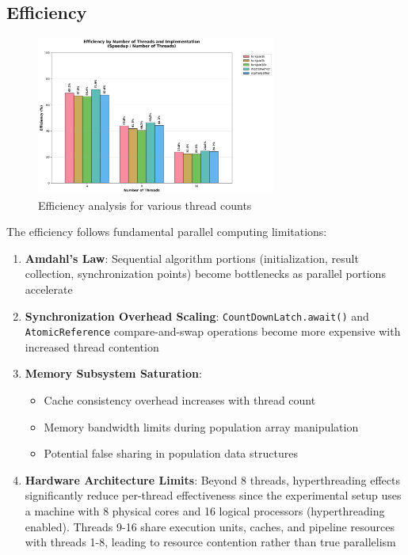 \newpage

\subsection{Efficiency}

\begin{figure}[htbp]
   \centering
   \includegraphics[width=0.7\textwidth]{images/efficiency_analysis.png}
   \caption{Efficiency analysis for various thread counts}
   \label{fig:efficiency}
\end{figure}

The efficiency follows fundamental parallel computing limitations:

\begin{enumerate}
   \item \textbf{Amdahl's Law}: Sequential algorithm portions (initialization, result collection, synchronization points) become bottlenecks as parallel portions accelerate
   \item \textbf{Synchronization Overhead Scaling}: \texttt{CountDownLatch.await()} and \texttt{AtomicReference} compare-and-swap operations become more expensive with increased thread contention
   \item \textbf{Memory Subsystem Saturation}:
      \begin{itemize}
      \item Cache consistency overhead increases with thread count
      \item Memory bandwidth limits during population array manipulation
      \item Potential false sharing in population data structures
      \end{itemize}
   \item \textbf{Hardware Architecture Limits}: Beyond 8 threads, hyperthreading effects significantly reduce per-thread effectiveness since the experimental setup uses a machine with 8 physical cores and 16 logical processors (hyperthreading enabled). Threads 9-16 share execution units, caches, and pipeline resources with threads 1-8, leading to resource contention rather than true parallelism
\end{enumerate}

